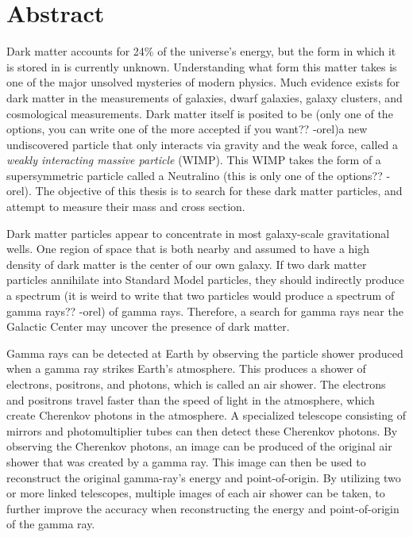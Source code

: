 \cleartooddpage[\thispagestyle{empty}]
\section*{Abstract}

Dark matter accounts for 24\% of the universe's energy, but the form in which it is stored in is currently unknown.
Understanding what form this matter takes is one of the major unsolved mysteries of modern physics.
Much evidence exists for dark matter in the measurements of galaxies, dwarf galaxies, galaxy clusters, and cosmological measurements.
Dark matter {\color{red}itself is posited to be (only one of the options, you can write one of the more accepted if you want?? -orel)}a new undiscovered particle that only interacts via gravity and the weak force, called a \textit{weakly interacting massive particle} (WIMP).
This WIMP takes the form of a supersymmetric particle called a Neutralino {\color{red}(this is only one of the options?? -orel)}.
The objective of this thesis is to search for these dark matter particles, and attempt to measure their mass and cross section.

Dark matter particles appear to concentrate in most galaxy-scale gravitational wells.
One region of space that is both nearby and assumed to have a high density of dark matter is the center of our own galaxy.
If two dark matter particles annihilate into Standard Model particles, they should indirectly produce a {\color{red}spectrum (it is weird to write that two particles would produce a spectrum of gamma rays?? -orel)} of gamma rays.
Therefore, a search for gamma rays near the Galactic Center may uncover the presence of dark matter.

Gamma rays can be detected at Earth by observing the particle shower produced when a gamma ray strikes Earth's atmosphere.
This produces a shower of electrons, positrons, and photons, which is called an air shower.
The electrons and positrons travel faster than the speed of light in the atmosphere, which create Cherenkov photons in the atmosphere.
A specialized telescope consisting of mirrors and photomultiplier tubes can then detect these Cherenkov photons.
By observing the Cherenkov photons, an image can be produced of the original air shower that was created by a gamma ray.
This image can then be used to reconstruct the original gamma-ray's energy and point-of-origin.
By utilizing two or more linked telescopes, multiple images of each air shower can be taken, to further improve the accuracy when reconstructing the energy and point-of-origin of the gamma ray.

